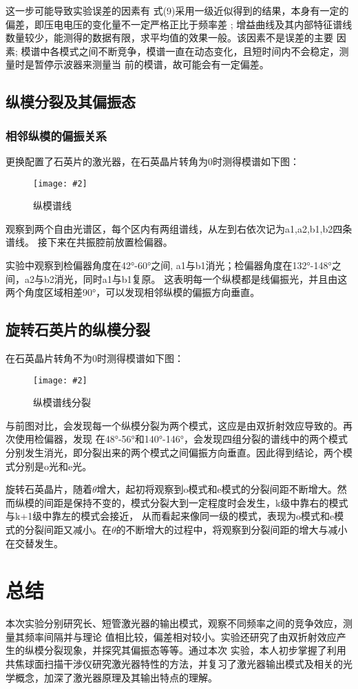 \documentclass[12pt,a4paper]{article}
\newcommand{\bfig}[3]{
    \begin{figure}[H]
        \centering
        \texttt{[image: \#2]}
        \caption{#3}
    \end{figure}
}
\begin{document}
这一步可能导致实验误差的因素有
式(9)采用一级近似得到的结果，本身有一定的偏差，即压电电压的变化量不一定严格正比于频率差
; 增益曲线及其内部特征谱线数量较少，能测得的数据有限，求平均值的效果一般。该因素不是误差的主要
因素; 模谱中各模式之间不断竞争，模谱一直在动态变化，且短时间内不会稳定，测量时是暂停示波器来测量当
前的模谱，故可能会有一定偏差。
\subsection{纵模分裂及其偏振态}
\subsubsection{相邻纵模的偏振关系}
更换配置了石英片的激光器，在石英晶片转角为0时测得模谱如下图：
\bfig{0.7}{偏振谱.jpg}{纵模谱线}
观察到两个自由光谱区，每个区内有两组谱线，从左到右依次记为a1,a2,b1,b2四条谱线。
接下来在共振腔前放置检偏器。

实验中观察到检偏器角度在42°-60°之间, a1与b1消光；检偏器角度在132°-148°之间，a2与b2消光，同时a1与b1复原。
这表明每一个纵模都是线偏振光，并且由这两个角度区域相差90°，可以发现相邻纵模的偏振方向垂直。
\subsection{旋转石英片的纵模分裂}
在石英晶片转角不为0时测得模谱如下图：
\bfig{0.7}{偏振分裂.jpg}{纵模谱线分裂}
与前图对比，会发现每一个纵模分裂为两个模式，这应是由双折射效应导致的。再次使用检偏器，发现
在48°-56°和140°-146°，会发现四组分裂的谱线中的两个模式分别发生消光，即分裂出来的两个模式之间偏振方向垂直。因此得到结论，两个模式分别是o光和e光。

旋转石英晶片，随着$\theta$增大，起初将观察到o模式和e模式的分裂间距不断增大。然而纵模的间距是保持不变的，模式分裂大到一定程度时会发生，k级中靠右的模式与k+1级中靠左的模式会接近，
从而看起来像同一级的模式，表现为o模式和e模式的分裂间距又减小。在$\theta$的不断增大的过程中，将观察到分裂间距的增大与减小在交替发生。
\section{总结}
本次实验分别研究长、短管激光器的输出模式，观察不同频率之间的竞争效应，测量其频率间隔并与理论
值相比较，偏差相对较小。实验还研究了由双折射效应产生的纵模分裂现象，并探究其偏振态等等。通过本次
实验，本人初步掌握了利用共焦球面扫描干涉仪研究激光器特性的方法，并复习了激光器输出模式及相关的光
学概念，加深了激光器原理及其输出特点的理解。
\end{document}
